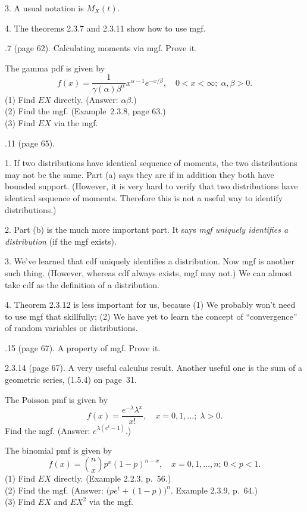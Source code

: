 \documentclass[12pt]{article}
\begin{document}
3.
A usual notation is $M_X(t)$.

4.
The theorems 2.3.7 and 2.3.11 show how to use mgf.

.7 (page 62). Calculating moments via mgf.
Prove it.

\example The gamma pdf is given by
\[
f(x) = \frac{1}{\gamma(\alpha) \beta^\alpha} x^{\alpha-1} e^{-x/\beta},
\quad
0 < x < \infty;\;
\alpha,\beta > 0.
\]
(1) Find $E X$ directly. (Answer: $\alpha\beta$.)\\
(2) Find the mgf. (Example~2.3.8, page 63.)\\
(3) Find $E X$ via the mgf.


.11 (page 65).

\alert
1. If two distributions have identical sequence of moments,
the two distributions may not be the same.
Part (a) says they are if in addition they both have bounded support.
(However, it is very hard to verify that two distributions have
identical sequence of moments. Therefore this is not a useful way to identify
distributions.)

2. Part (b) is the much more important part. It says \emph{mgf uniquely
identifies a distribution} (if the mgf exists).

3. We've learned that cdf uniquely identifies a distribution.
Now mgf is another such thing. (However, whereas cdf always exists,
mgf may not.)
We can almost take cdf as the definition of a distribution.

4. Theorem 2.3.12 is less important for us, because
(1) We probably won't need to use mgf that skillfully;
(2) We have yet to learn the concept of ``convergence'' of random
variables or distributions.

.15 (page 67). A property of mgf. Prove it.

\alert[Lemma]%
2.3.14 (page 67). A very useful calculus result.
Another useful one is the sum of a geometric series,
(1.5.4) on page~31.

\example
The Poisson pmf is given by
\[
f(x) = \frac{e^{-\lambda} \lambda^x}{x!},
\quad
x = 0,1,\dotsc;\;
\lambda > 0.
\]
Find the mgf.
(Answer: $e^{\lambda(e^t - 1)}$.)


\example
The binomial pmf is given by
\[
f(x) = {n\choose x} p^x (1-p)^{n-x},
\quad
x=0,1,\dotsc,n;\,
0 < p < 1.
\]
(1) Find $E X$ directly. (Example 2.2.3, p.~56.)
\\
(2) Find the mgf.
(Answer: $\bigl(pe^t + (1-p)\bigr)^n$.
Example  2.3.9, p.~64.)
\\
(3) Find $E X$ and $E X^2$ via the mgf.
\end{document}
